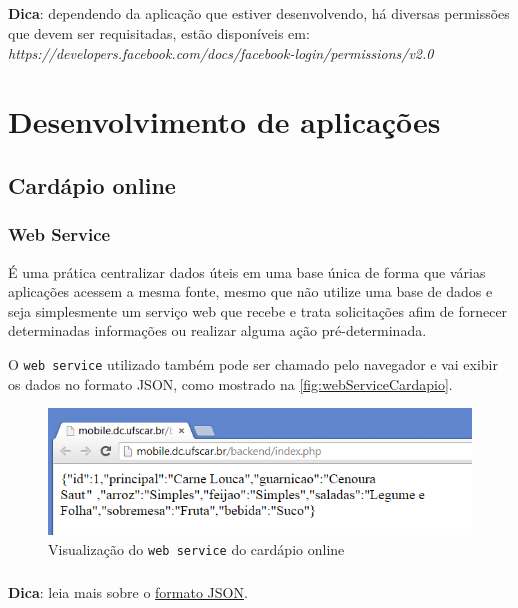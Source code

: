 \documentclass[a4paper,12pt,brazil,oneside]{book}
\begin{document}
\begin{framed}
	\paragraph{}\textbf{Dica}: dependendo da aplicação que estiver desenvolvendo, há diversas permissões que devem ser requisitadas, estão disponíveis em: 
	\textit{https://developers.facebook.com/docs/facebook-login/permissions/v2.0}
	\end{framed}
	
	
\chapter{Desenvolvimento de aplicações}


\section{Cardápio online}

\subsection{Web Service}

É uma prática centralizar dados úteis em uma base única de forma que várias aplicações acessem a mesma fonte, mesmo que não utilize uma base de dados e seja simplesmente um serviço web que recebe e trata solicitações afim de fornecer determinadas informações ou realizar alguma ação pré-determinada.

O \texttt{web service} utilizado também pode ser chamado pelo navegador e vai exibir os dados no formato JSON, como mostrado na \autoref{fig:webServiceCardapio}.

\begin{figure}[H]
  \centering
  \includegraphics[width=.75\textwidth]{figuras/devapp/cardapio/APP_Cardapio3.png}
  \caption{Visualização do \texttt{web service} do cardápio online}
  \label{fig:webServiceCardapio}
\end{figure}

\begin{framed}
\paragraph{}\textbf{Dica}: leia mais sobre o \href{http://alexandregama.org/2011/12/19/json-simples-e-pratico-parte-i/}{formato JSON}.
\end{framed}
\end{document}
